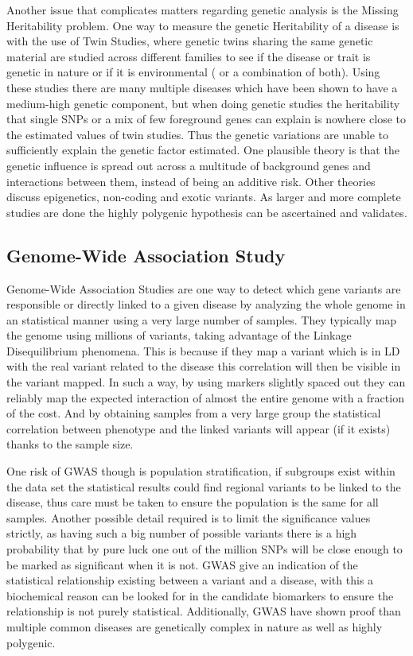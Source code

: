 Another issue that complicates matters regarding genetic analysis is the Missing Heritability problem. One way to measure the genetic Heritability of a disease is with the use of Twin Studies, where genetic twins sharing the same genetic material are studied across different families to see if the disease or trait is genetic in nature or if it is environmental ( or a combination of both). Using these studies there are many multiple diseases which have been shown to have a medium-high genetic component, but when doing genetic studies the heritability that single SNPs or a mix of few foreground genes can explain is nowhere close to the estimated values of twin studies. Thus the genetic variations are unable to sufficiently explain the genetic factor estimated. One plausible theory is that the genetic influence is spread out across a multitude of background genes and interactions between them, instead of being an additive risk. Other theories discuss epigenetics, non-coding and exotic variants. As larger and more complete studies are done the highly polygenic hypothesis can be ascertained and validates.

\subsection{Genome-Wide Association Study}
\label{GWAS}
Genome-Wide Association Studies are one way to detect which gene variants are responsible or directly linked to a given disease by analyzing the whole genome in an statistical manner using a very large number of samples. They typically map the genome using millions of variants, taking advantage of the Linkage Disequilibrium phenomena. This is because if they map a variant which is in LD with the real variant related to the disease this correlation will then be visible in the variant mapped. In such a way, by using markers slightly spaced out they can reliably map the expected interaction of almost the entire genome with a fraction of the cost. And by obtaining samples from a very large group the statistical correlation between phenotype and the linked variants will appear (if it exists) thanks to the sample size.\cite{nussbaum_mcinnes_willard_2016}


One risk of GWAS though is population stratification, if subgroups exist within the data set the statistical results could find regional variants to be linked to the disease, thus care must be taken to ensure the population is the same for all samples. Another possible detail required is to limit the significance values strictly, as having such a big number of possible variants there is a high probability that by pure luck one out of the million SNPs will be close enough to be marked as significant when it is not. GWAS give an indication of the statistical relationship existing between a variant and a disease, with this a biochemical reason can be looked for in the candidate biomarkers to ensure the relationship is not purely statistical. Additionally, GWAS have shown proof than multiple common diseases are genetically complex in nature as well as highly polygenic.\cite{nussbaum_mcinnes_willard_2016}

